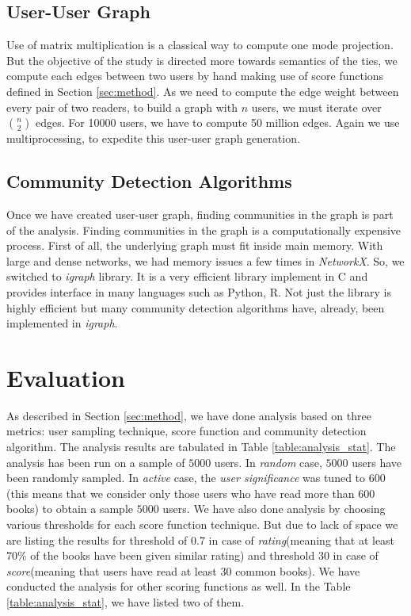 \documentclass[11pt]{article}
\begin{document}
\subsection{User-User Graph}
Use of matrix multiplication is a classical way to compute one mode projection. But the objective of the study is directed more towards semantics of the ties, we compute each edges between two users by hand making use of score functions defined in Section \ref{sec:method}. As we need to compute the edge weight between every pair of two readers, to build a graph with $n$ users, we must iterate over $n \choose 2$ edges. For 10000 users, we have to compute 50 million edges. Again we use multiprocessing, to expedite this user-user graph generation.

\subsection{Community Detection Algorithms}
Once we have created user-user graph, finding communities in the graph is part of the analysis. Finding communities in the graph is a computationally expensive process. First of all, the underlying graph must fit inside main memory. With large and dense networks, we had memory issues a few times in {\it NetworkX}. So, we switched to {\it igraph} library\cite{igraph}. It is a very efficient library implement in C and provides interface in many languages such as Python, R. Not just the library is highly efficient but many community detection algorithms have, already, been implemented in {\it igraph}.


\section{Evaluation}

As described in Section \ref{sec:method}, we have done analysis based on three metrics: user sampling technique, score function and community detection algorithm. The analysis results are tabulated in Table \ref{table:analysis_stat}. The analysis has been run on a sample of $5000$ users. In {\it random} case, $5000$ users have been randomly sampled. In {\it active} case, the {\it user significance} was tuned to $600$(this means that we consider only those users who have read more than $600$ books) to obtain a sample $5000$ users. We have also done analysis by choosing various thresholds for each score function technique. But due to lack of space we are listing the results for threshold of 0.7 in case of {\it rating}(meaning that at least $70\%$ of the books have been given similar rating) and threshold 30 in case of {\it score}(meaning that users have read at least 30 common books). We have conducted the analysis for other scoring functions as well. In the Table \ref{table:analysis_stat}, we have listed two of them.
\end{document}
